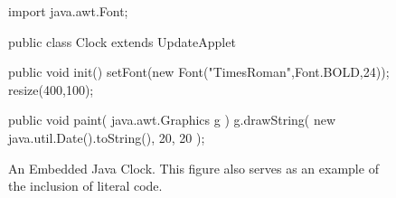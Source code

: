 \documentclass[proposal]{bsu-ms}
\begin{document}
%
%
%
% 

\begin{figure}[t]

\begin{vcode}  
  import java.awt.Font;

  public class Clock extends UpdateApplet {
      public void init() {
          setFont(new Font("TimesRoman",Font.BOLD,24));
          resize(400,100);
      }

      public void paint( java.awt.Graphics g ) {
          g.drawString( new java.util.Date().toString(), 20, 20 );
      }
  }
\end{vcode}
\caption[An Embedded Java Clock]{An Embedded Java Clock.  This figure
also serves as an example of the inclusion of literal code.}
%
\label{fig:code} 
\end{figure}
\end{document}
